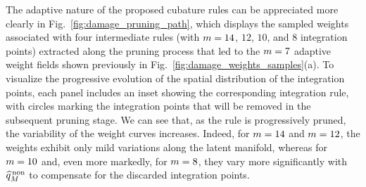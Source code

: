 \documentclass[preprint,10pt]{elsarticle}  %
\begin{document}









The adaptive nature of the proposed cubature rules can be appreciated
more clearly in Fig.~\ref{fig:damage_pruning_path}, which displays the
sampled weights associated with four intermediate rules (with
\(m=14\), \(12\), \(10\), and \(8\) integration points)
extracted along the pruning process that led to the \(m=7\)
adaptive weight fields shown previously in
Fig.~\ref{fig:damage_weights_samples}(a).     To visualize the progressive evolution of the spatial distribution of
the integration points, each panel includes an inset showing the
corresponding integration rule, with circles marking the integration
points that will be removed in the subsequent pruning stage. We can
see that, as the rule is progressively pruned, the variability of the
weight curves increases.  Indeed, for \(m=14\) and \(m=12\), the weights exhibit
only mild variations along the latent manifold, whereas for
\(m=10\) and, even more markedly, for \(m=8\), they vary
more significantly with \(\widehat{q}^{\mathrm{\,non}}_{M}\) to compensate for the discarded
integration points.
\end{document}
